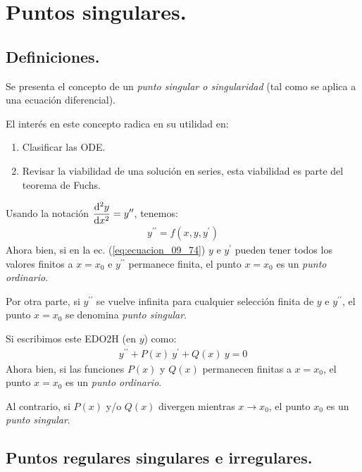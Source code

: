 \documentclass[12pt]{article}
\newcommand{\pderivada}[1]{\ensuremath{{#1}^{\prime}}}
\newcommand{\sderivada}[1]{\ensuremath{{#1}^{\prime \prime}}}
\numberwithin{equation}{section}
\begin{document}
\section{Puntos singulares.}
\subsection{Definiciones.}

Se presenta el concepto de un \emph{punto singular o singularidad} (tal como se aplica a una ecuación diferencial).
\par
El interés en este concepto radica en su utilidad en:
\begin{enumerate}
\item Clasificar las ODE.
\item Revisar la viabilidad de una solución en series, esta viabilidad es parte del teorema de Fuchs.
\end{enumerate}
Usando la notación $\displaystyle \dv[2]{y}{x} = \sderivada{y}$, tenemos:
\begin{align}
\sderivada{y} = f(x, y, \pderivada{y})
\label{eq:ecuacion_09_74}
\end{align}
Ahora bien, si en la ec. (\ref{eq:ecuacion_09_74}) $y$ e $\pderivada{y}$ pueden tener todos los valores finitos a $x = x_{0}$ e $\sderivada{y}$ permanece finita, el punto $x = x_{0}$ es un \emph{punto ordinario}.

Por otra parte, si $\sderivada{y}$ se vuelve infinita para cualquier selección finita de $y$ e  $\sderivada{y}$, el punto $x = x_{0}$ se denomina \emph{punto singular}.

Si escribimos este EDO2H (en $y$) como:
\begin{align}
\sderivada{y} + P (x) \: \pderivada{y} + Q (x) \: y = 0
\label{eq:ecuacion_09_75}
\end{align}
Ahora bien, si las funciones $P (x)$ y $Q (x)$ permanecen finitas a $x = x_{0}$, el punto $x = x_{0}$ es un \emph{punto ordinario}.

Al contrario, si $P (x)$ y/o $Q (x)$ divergen mientras $x \to x_{0}$, el punto $x_{0}$ es un \emph{punto singular}.

\subsection{Puntos regulares singulares e irregulares.}
\end{document}
